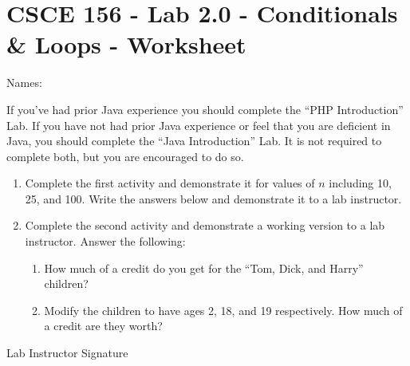 \documentclass[12pt]{scrartcl}
\begin{document}
\section*{CSCE 156 - Lab 2.0 - Conditionals \& Loops - Worksheet}

Names: \underline{\hspace{10cm}}

If you've had prior Java experience you should complete the 
``PHP Introduction'' Lab.  If you have not had prior Java 
experience or feel that you are deficient in Java, you should 
complete the ``Java Introduction'' Lab.  It is not required to 
complete both, but you are encouraged to do so.

\begin{enumerate}
  \item Complete the first activity and demonstrate it for values of $n$
  including 10, 25, and 100.  Write the answers below and demonstrate 
  it to a lab instructor.

  \item Complete the second activity and demonstrate a working version 
  to a lab instructor.  Answer the following:
  \begin{enumerate}
    \item How much of a credit do you get for the ``Tom, Dick, and Harry'' children? 
    \item Modify the children to have ages 2, 18, and 19 respectively.  
    How much of a credit are they worth?
  \end{enumerate}
\end{enumerate}

Lab Instructor Signature\underline{\hspace{7.5cm}}
\end{document}
